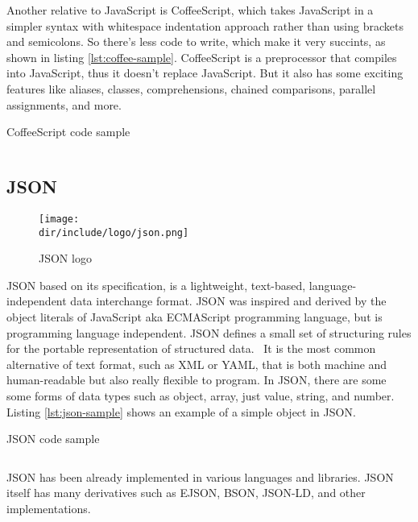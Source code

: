 Another relative to JavaScript is CoffeeScript, which takes JavaScript in a simpler syntax with whitespace indentation approach rather than using brackets and semicolons.
So there's less code to write, which make it very succints, as shown in listing \autoref{lst:coffee-sample}.
CoffeeScript is a preprocessor that compiles into JavaScript, thus it doesn't replace JavaScript.
But it also has some exciting features like aliases, classes, comprehensions, chained comparisons, parallel assignments, and more.

\begin{listing}[ht]
\caption{CoffeeScript code sample}
\inputminted{javascript}{\dir/include/coffee-sample.coffee}
\label{lst:coffee-sample}
\end{listing}

\subsection{JSON}

\begin{wrapfigure}{r}{0.5\textwidth}
  \vspace{-20pt}
  \begin{center}
    \texttt{[image: \\dir/include/logo/json.png]}
  \end{center}
  \vspace{-20pt}
  \caption{JSON logo}
  \label{fig:json-logo}
  \vspace{-10pt}
\end{wrapfigure}

\ac{JSON} based on its specification, is a lightweight, text-based, language-independent data interchange format.
\ac{JSON} was inspired and derived by the object literals of JavaScript aka ECMAScript programming language, but is programming language independent.
\ac{JSON} defines a small set of structuring rules for the portable representation of structured data.~\autocite{ECMA:2013:JSON}
It is the most common alternative of text format, such as \ac{XML} or \ac{YAML}, that is both machine and human-readable but also really flexible to program.
In \ac{JSON}, there are some some forms of data types such as object, array, just value, string, and number.
Listing \autoref{lst:json-sample} shows an example of a simple object in \ac{JSON}.

\begin{listing}[ht]
\caption{JSON code sample}
\inputminted{javascript}{\dir/include/json-sample.json}
\label{lst:json-sample}
\end{listing}

JSON has been already implemented in various languages and libraries.
JSON itself has many derivatives such as \ac{EJSON}, \ac{BSON}, \ac{JSON-LD}, and other implementations.
